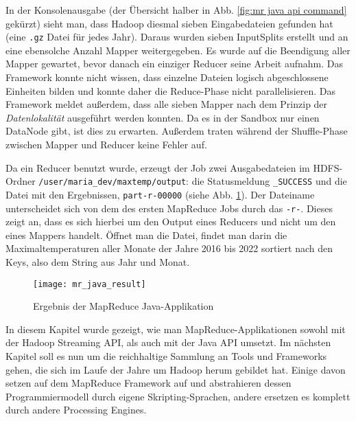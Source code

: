 In der Konsolenausgabe (der Übersicht halber in Abb. \ref{fig:mr java api command} gekürzt) sieht man, dass Hadoop diesmal sieben Eingabedateien gefunden hat (eine \verb|.gz| Datei für jedes Jahr). Daraus wurden sieben InputSplits erstellt und an eine ebensolche Anzahl Mapper weitergegeben. Es wurde auf die Beendigung aller Mapper gewartet, bevor danach ein einziger Reducer seine Arbeit aufnahm. Das Framework konnte nicht wissen, dass einzelne Dateien logisch abgeschlossene Einheiten bilden und konnte daher die Reduce-Phase nicht parallelisieren. Das Framework meldet außerdem, dass alle sieben Mapper nach dem Prinzip der \textit{Datenlokalität} ausgeführt werden konnten. Da es in der Sandbox nur einen DataNode gibt, ist dies zu erwarten. Außerdem traten während der Shuffle-Phase zwischen Mapper und Reducer keine Fehler auf.
\par
Da ein Reducer benutzt wurde, erzeugt der Job zwei Ausgabedateien im HDFS-Ordner \verb|/user/maria_dev/maxtemp/output|: die Statusmeldung \verb|_SUCCESS| und die Datei mit den Ergebnissen, \verb|part-r-00000| (siehe Abb. \ref{fig:mr java api result}). Der Dateiname unterscheidet sich von dem des ersten MapReduce Jobs durch das \verb|-r-|. Dieses zeigt an, dass es sich hierbei um den Output eines Reducers und nicht um den eines Mappers handelt. Öffnet man die Datei, findet man darin die Maximaltemperaturen aller Monate der Jahre 2016 bis 2022 sortiert nach den Keys, also dem String aus Jahr und Monat. 

\begin{figure}[ht]
    \centering
    \texttt{[image: mr\_java\_result]}
    \caption[Ergebnis der MapReduce Java-Applikation]{Ergebnis der MapReduce Java-Applikation}
    \label{fig:mr java api result}
\end{figure}

In diesem Kapitel wurde gezeigt, wie man MapReduce-Applikationen sowohl mit der Hadoop Streaming API, als auch mit der Java API umsetzt. Im nächsten Kapitel soll es nun um die reichhaltige Sammlung an Tools und Frameworks gehen, die sich im Laufe der Jahre um Hadoop herum gebildet hat. Einige davon setzen auf dem MapReduce Framework auf und abstrahieren dessen Programmiermodell durch eigene Skripting-Sprachen, andere ersetzen es komplett durch andere Processing Engines. 